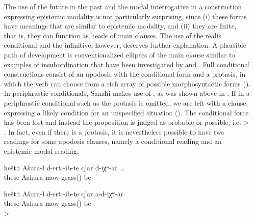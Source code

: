 The use of the future in the past and the modal interrogative in a construction expressing epistemic modality is not particularly surprising, since (i) these forms have meanings that are similar to epistemic modality, and (ii) they are finite, that is, they can function as heads of main clauses. The use of the realis conditional and the infinitive, however, deserves further explanation. A plausible path of development is conventionalized ellipses of the main clause similar to examples of insubordination that have been investigated by \citet{Evans2007} and \citet{EvansWatanabe2016}. Full conditional constructions consist of an apodosis with the conditional form and a protasis, in which the verb can choose from a rich array of possible morphosyntactic forms (). In periphrastic conditionals, Sanzhi makes use of , as was shown above in . If in a periphrastic conditional such as  the protasis is omitted, we are left with a clause expressing a likely condition for an unspecified situation (). The conditional force has been lost and instead the proposition is judged as probable or possible, i.e.  >  . In fact, even if there is a protasis, it is nevertheless possible to have two readings for some apodosis clauses, namely a conditional reading and an epistemic modal reading.
%
\begin{exe}
	\ex	\label{ex:Ashura mows the lawn}
	\begin{xlist}
		\ex	\label{ex:‎‎If Ashura has mowed this grass@A}
		\gll	heštːi	Ašura-l d-ertː-ib-te	q'ar	d-iχʷ-ar \ldots\\
			these	Ashura	mow 	grass() be\\
		\glt	{}

		\ex	\label{ex:‎‎If Ashura has not mowed this grass@B}
		\gll	heštːi	Ašura-l d-ertː-ib-te	q'ar	a-d-iχʷ-ar \\
			these	Ashura	mow 	grass() be\\
		\glt	{} > 
	\end{xlist}
\end{exe}

